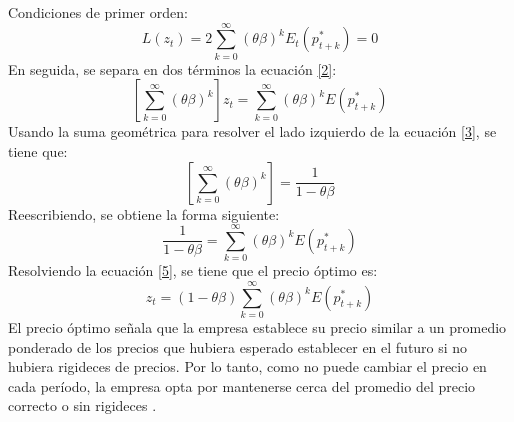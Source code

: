  Condiciones de primer orden:
\begin{equation}\label{2}
L(z_{t})=2\sum_{k=0}^{\infty} (\theta\beta)^{k}E_{t}(p_{t+k}^*)=0
\end{equation}
En seguida, se separa en dos términos la ecuación \eqref{2}:
\begin{equation}\label{3}
\left[\sum_{k=0}^{\infty}(\theta\beta)^{k} \right] z_{t}=\sum_{k=0}^{\infty}(\theta\beta)^{k}E(p_{t+k}^*)
\end{equation}
Usando la suma geométrica para resolver el lado izquierdo de la ecuación \eqref{3}, se tiene que:
\begin{equation}\label{4}
\left[\sum_{k=0}^{\infty}(\theta\beta)^{k} \right]=\frac{1}{1-\theta\beta}
\end{equation}
Reescribiendo, se obtiene la forma siguiente:
\begin{equation}\label{5}
\frac{1}{1-\theta\beta}=\sum_{k=0}^{\infty}(\theta\beta)^{k}E(p_{t+k}^*)
\end{equation}
Resolviendo la ecuación \eqref{5}, se tiene que el precio óptimo es:
\begin{equation}\label{6}
z_{t}=(1-\theta\beta)\sum_{k=0}^{\infty}(\theta\beta)^{k}E(p_{t+k}^*)
\end{equation}
El precio óptimo señala que la empresa establece su precio similar a un promedio ponderado de los precios que hubiera esperado establecer en el futuro si no hubiera rigideces de precios. Por lo tanto, como no puede cambiar el precio en cada período, la empresa opta por mantenerse cerca del promedio del precio correcto o sin rigideces \citep{whelan2009lecture}. 

